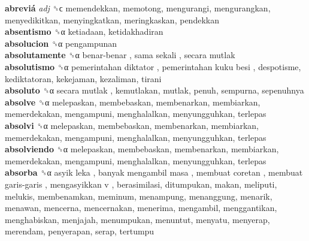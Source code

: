 \textbf{abreviá} \emph{adj}  ␝ϲ  memendekkan, memotong, mengurangi, mengurangkan, menyedikitkan, menyingkatkan, meringkaskan, pendekkan  \\
\textbf{absentismo} ␝α  ketiadaan, ketidakhadiran  \\
\textbf{absolucion} ␝α  pengampunan  \\
\textbf{absolutamente} ␝α   benar-benar ,  sama sekali ,  secara mutlak   \\
\textbf{absolutismo} ␝α   pemerintahan diktator ,  pemerintahan kuku besi , despotisme, kediktatoran, kekejaman, kezaliman, tirani  \\
\textbf{absoluto} ␝α   secara mutlak , kemutlakan, mutlak, penuh, sempurna, sepenuhnya  \\
\textbf{absolve} ␝α  melepaskan, membebaskan, membenarkan, membiarkan, memerdekakan, mengampuni, menghalalkan, menyungguhkan, terlepas  \\
\textbf{absolvi} ␝α  melepaskan, membebaskan, membenarkan, membiarkan, memerdekakan, mengampuni, menghalalkan, menyungguhkan, terlepas  \\
\textbf{absolviendo} ␝α  melepaskan, membebaskan, membenarkan, membiarkan, memerdekakan, mengampuni, menghalalkan, menyungguhkan, terlepas  \\
\textbf{absorba} ␝α   asyik leka ,  banyak mengambil masa ,  membuat coretan ,  membuat garis-garis ,  mengasyikkan v , berasimilasi, ditumpukan, makan, meliputi, melukis, membenamkan, meminum, menampung, menanggung, menarik, menawan, mencerna, mencernakan, menerima, mengambil, menggantikan, menghabiskan, menjajah, menumpukan, menuntut, menyatu, menyerap, merendam, penyerapan, serap, tertumpu  \\
